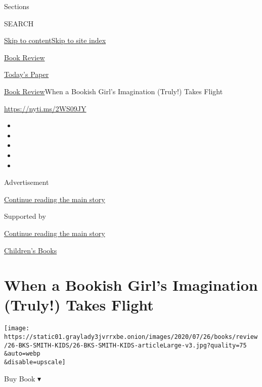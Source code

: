 Sections

SEARCH

\protect\hyperlink{site-content}{Skip to
content}\protect\hyperlink{site-index}{Skip to site index}

\href{https://www.nytimes3xbfgragh.onion/section/books/review}{Book
Review}

\href{https://myaccount.nytimes3xbfgragh.onion/auth/login?response_type=cookie\&client_id=vi}{}

\href{https://www.nytimes3xbfgragh.onion/section/todayspaper}{Today's
Paper}

\href{/section/books/review}{Book Review}\textbar{}When a Bookish Girl's
Imagination (Truly!) Takes Flight

\url{https://nyti.ms/2WS09JY}

\begin{itemize}
\item
\item
\item
\item
\item
\end{itemize}

Advertisement

\protect\hyperlink{after-top}{Continue reading the main story}

Supported by

\protect\hyperlink{after-sponsor}{Continue reading the main story}

\href{/column/childrens-books}{Children's Books}

\hypertarget{when-a-bookish-girls-imagination-truly-takes-flight}{%
\section{When a Bookish Girl's Imagination (Truly!) Takes
Flight}\label{when-a-bookish-girls-imagination-truly-takes-flight}}

\texttt{[image: https://static01.graylady3jvrrxbe.onion/images/2020/07/26/books/review/26-BKS-SMITH-KIDS/26-BKS-SMITH-KIDS-articleLarge-v3.jpg?quality=75\\\&auto=webp\\\&disable=upscale]}

Buy Book ▾

